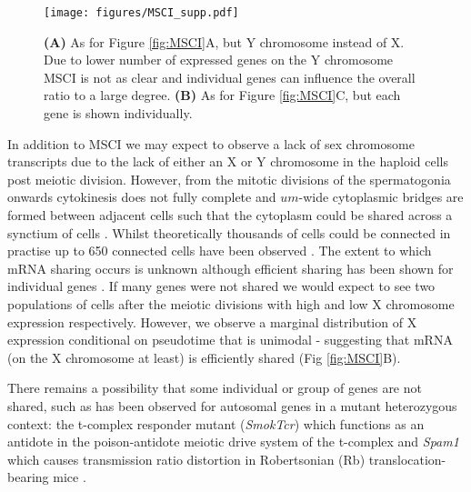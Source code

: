 \begin{figure}[H]
	\centering
	\texttt{[image: figures/MSCI\_supp.pdf]}
	\caption{
		\textbf{(A)} As for Figure \ref{fig:MSCI}A, but Y chromosome instead of X. Due to lower number of expressed genes on the Y chromosome MSCI is not as clear and individual genes can influence the overall ratio to a large degree.
		\textbf{(B)} As for Figure \ref{fig:MSCI}C, but each gene is shown individually.}
	\label{fig:MSCI_supp}
\end{figure}


In addition to MSCI we may expect to observe a lack of sex chromosome transcripts due to the lack of either an X or Y chromosome in the haploid cells post meiotic division. However, from the mitotic divisions of the spermatogonia onwards cytokinesis does not fully complete and $um$-wide cytoplasmic bridges are formed between adjacent cells such that the cytoplasm could be shared across a synctium of cells \cite{Greenbaum2011Germ}. Whilst theoretically thousands of cells could be connected in practise up to 650 connected cells have been observed \cite{Ren1991Clonal}. The extent to which mRNA sharing occurs is unknown although efficient sharing has been shown for individual genes \cite{Braun1989Genetically}. If many genes were not shared we would expect to see two populations of cells after the meiotic divisions with high and low X chromosome expression respectively. However, we observe a marginal distribution of X expression conditional on pseudotime that is unimodal - suggesting that mRNA (on the X chromosome at least) is efficiently shared (Fig \ref{fig:MSCI}B).

There remains a possibility that some individual or group of genes are not shared, such as has been observed for autosomal genes in a mutant heterozygous context: the t-complex responder mutant (\textit{SmokTcr}) which functions as an antidote in the poison-antidote meiotic drive system of the t-complex \cite{Veron2009Retention} and \textit{Spam1} which causes transmission ratio distortion in Robertsonian (Rb) translocation-bearing mice \cite{Martin-DeLeon2005Spam1associated}.

